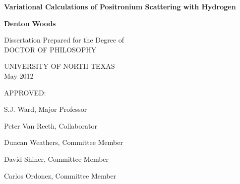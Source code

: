 
\begin{titlepage}
    \begin{center}
        \vspace*{1cm}
        
        \LARGE
        \textbf{Variational Calculations of Positronium Scattering with Hydrogen}
        \vspace{0.5cm}
		
        \Large     
        \textbf{Denton Woods}
        
        \vspace{4cm}
        
		\normalsize
        Dissertation Prepared for the Degree of\\
        DOCTOR OF PHILOSOPHY
        
		\vspace{4cm}
		
        \normalsize
		UNIVERSITY OF NORTH TEXAS\\
		May 2012
    \end{center}

	\vfill
  
	\hspace{8cm} APPROVED:
	\vspace{0.1cm}
	
	\hspace{8cm} S.J. Ward, Major Professor

	\hspace{8cm} Peter Van Reeth, Collaborator

	\hspace{8cm} Duncan Weathers, Committee Member

	\hspace{8cm} David Shiner, Committee Member

	\hspace{8cm} Carlos Ordonez, Committee Member

\end{titlepage}